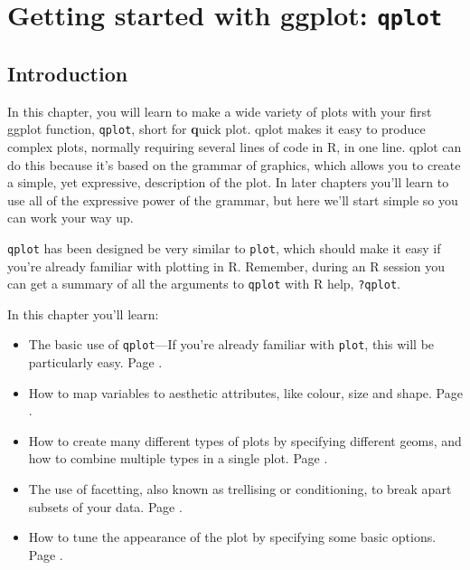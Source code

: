 


% 



\chapter{Getting started with ggplot: {\tt qplot}}

\section{Introduction} 

In this chapter, you will learn to make a wide variety of plots with your first ggplot function, {\tt qplot}, short for {\bf q}uick plot. qplot makes it easy to produce complex plots, normally requiring several lines of code in R, in one line. qplot can do this because it's based on the grammar of graphics, which allows you to create a simple, yet expressive, description of the plot.  In later chapters you'll learn to use all of the expressive power of the grammar, but here we'll start simple so you can work your way up.

{\tt qplot} has been designed be very similar to {\tt plot}, which should make it easy if you're already familiar with plotting in R.  Remember, during an R session you can get a summary of all the arguments to {\tt qplot} with R help, {\tt ?qplot}.

In this chapter you'll learn:

\begin{itemize}
	\item The basic use of {\tt qplot}---If you're already familiar with {\tt plot}, this will be particularly easy. Page \pageref{sec:basic_use}.
	\item How to map variables to aesthetic attributes, like colour, size and shape. Page \pageref{sec:aesthetic_attributes}.
	\item How to create many different types of plots by specifying different geoms, and how to combine multiple types in a single plot. Page \pageref{sec:plot_geoms}.
	\item The use of facetting, also known as trellising or conditioning, to break apart subsets of your data. Page \pageref{sec:facetting}.
	\item How to tune the appearance of the plot by specifying some basic options. Page \pageref{sec:other_options}.
\end{itemize}

